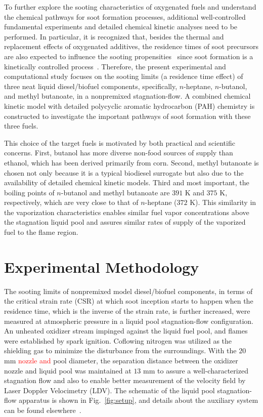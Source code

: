 \documentclass[review,3p,times]{elsarticleUS}
\begin{document}
To further explore the sooting characteristics of oxygenated fuels and understand the chemical pathways for soot formation processes, additional well-controlled fundamental experiments and detailed chemical kinetic analyses need to be performed.  In particular, it is recognized that, besides the thermal and replacement effects of oxygenated additives, the residence times of soot precursors are also expected to influence the sooting propensities~\cite{tsuji71} since soot formation is a kinetically controlled process~\cite{vandsburger85}.  Therefore, the present experimental and computational study focuses on the sooting limits (a residence time effect) of three neat liquid diesel/biofuel components, specifically, $n$-heptane, $n$-butanol, and methyl butanoate, in a nonpremixed stagnation-flow. A combined chemical kinetic model with detailed polycyclic aromatic hydrocarbon (PAH) chemistry is constructed to investigate the important pathways of soot formation with these three fuels.

This choice of the target fuels is motivated by both practical and scientific concerns. First, butanol has more diverse non-food sources of supply than ethanol, which has been derived primarily from corn. Second, methyl butanoate is chosen not only because it is a typical biodiesel surrogate but also due to the availability of detailed chemical kinetic models. Third and most important, the boiling points of $n$-butanol and methyl butanoate are $391$ K and $375$ K, respectively, which are very close to that of $n$-heptane ($372$ K). This similarity in the vaporization characteristics enables similar fuel vapor concentrations above the stagnation liquid pool and assures similar rates of supply of the vaporized fuel to the flame region.


\section{Experimental Methodology}
\label{sec:2}

The sooting limits of nonpremixed model diesel/biofuel components, in terms of the critical strain rate (CSR) at which soot inception starts to happen when the residence time, which is the inverse of the strain rate, is further increased, were measured at atmospheric pressure in a liquid pool stagnation-flow configuration. An unheated oxidizer stream impinged against the liquid fuel pool, and flames were established by spark ignition. Coflowing nitrogen was utilized as the shielding gas to minimize the disturbance from the surroundings.  With the $20$ mm \textcolor{red}{nozzle and }pool diameter, the separation distance between the oxidizer nozzle and liquid pool was maintained at $13$ mm to assure a well-characterized stagnation flow and also to enable better measurement of the velocity field by Laser Doppler Velocimetry (LDV).  The schematic of the liquid pool stagnation-flow apparatus is shown in Fig.~\ref{fig:setup}, and details about the auxiliary system can be found elsewhere~\cite{liu10}.
\end{document}
